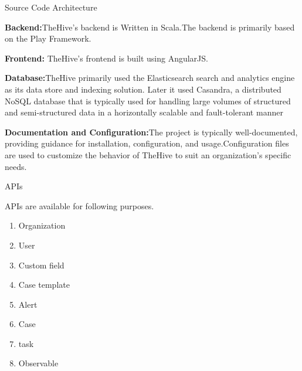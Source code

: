 \begin{frame}{Source Code Architecture}
\begin{justify}
           \item \begin{justify}
        \textbf{Backend:}TheHive's backend is Written in Scala.The backend is primarily based on the Play Framework.
    \end{justify}

    \item \begin{justify}
        \textbf{Frontend:} TheHive's frontend is built using AngularJS.
    \end{justify}

    \item \begin{justify}
        \textbf{Database:}TheHive primarily used the Elasticsearch search and analytics engine as its data store and indexing solution. Later it used Casandra, a distributed NoSQL database that is typically used for handling large volumes of structured and semi-structured data in a horizontally scalable and fault-tolerant manner
    \end{justify}

    \item \begin{justify}
        \textbf{Documentation and Configuration:}The project is typically well-documented, providing guidance for installation, configuration, and usage.Configuration files are used to customize the behavior of TheHive to suit an organization's specific needs.

    \end{justify}

    
\end{justify}
\end{frame}

\begin{frame}{APIs}
\begin{justify}
    APIs are available for following purposes.
    \begin{enumerate}
    \item Organization
    \item User
    \item Custom field
    \item Case template
    \item Alert
    \item Case
    \item task
    \item Observable

    \end{enumerate}

         
\end{justify}
\end{frame}





